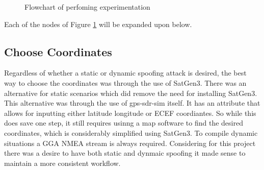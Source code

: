 \begin{figure}[h]
    \begin{center}
    \end{center}
    \caption{Flowchart of perfoming experimentation} \label{fig:Flowchart}
\end{figure}

Each of the nodes of Figure \ref{fig:Flowchart} will be expanded upon below. 

\subsection{Choose Coordinates}
Regardless of whether a static or dynamic spoofing attack is desired, the best way to choose the coordinates was through the use of SatGen3. There was an alternative for
static scenarios which did remove the need for installing SatGen3. This alternative was through the use of gps-sdr-sim itself. It has an attribute that allows for
inputting either latitude longitude or ECEF coordiantes. So while this does save one step, it still requires usinng a map software to find the desired coordinates, which
is considerably simplified using SatGen3. To compile dynamic situations a GGA NMEA stream is always required. Considering for this project there was a desire to have both static and dynmaic spoofing it made sense
to maintain a more consistent workflow.


